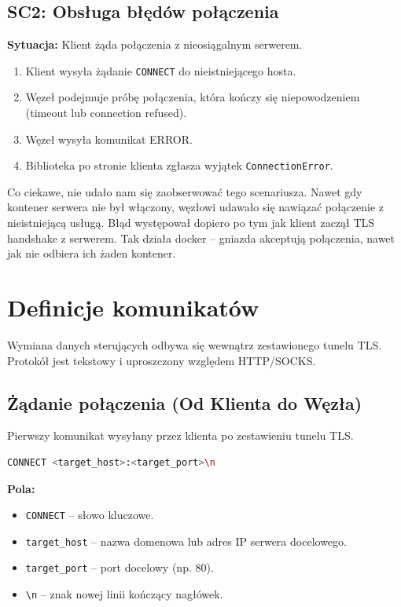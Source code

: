 \documentclass[12pt, a4paper]{article}
\begin{document}
\subsection{SC2: Obsługa błędów połączenia}
\textbf{Sytuacja:} Klient żąda połączenia z nieosiągalnym serwerem.
\begin{enumerate}
    \item Klient wysyła żądanie \texttt{CONNECT} do nieistniejącego hosta.
    \item Węzeł podejmuje próbę połączenia, która kończy się niepowodzeniem (timeout lub connection refused).
    \item Węzeł wysyła komunikat ERROR.
    \item Biblioteka po stronie klienta zgłasza wyjątek \texttt{ConnectionError}.
\end{enumerate}

Co ciekawe, nie udało nam się zaobserwować tego scenariusza. Nawet gdy kontener serwera
nie był włączony, węzłowi udawało się nawiązać połączenie z nieistniejącą usługą. Błąd występował
dopiero po tym jak klient zaczął TLS handshake z serwerem. Tak działa docker -- gniazda akceptują
połączenia, nawet jak nie odbiera ich żaden kontener.

\section{Definicje komunikatów}

Wymiana danych sterujących odbywa się wewnątrz zestawionego tunelu TLS. Protokół jest tekstowy i uproszczony względem HTTP/SOCKS.

\subsection{Żądanie połączenia (Od Klienta do Węzła)}
Pierwszy komunikat wysyłany przez klienta po zestawieniu tunelu TLS.

\begin{lstlisting}[language=bash, caption=Format komunikatu CONNECT]
CONNECT <target_host>:<target_port>\n
\end{lstlisting}

\noindent \textbf{Pola:}
\begin{itemize}
    \item \texttt{CONNECT} – słowo kluczowe.
    \item \texttt{target\_host} – nazwa domenowa lub adres IP serwera docelowego.
    \item \texttt{target\_port} – port docelowy (np. 80).
    \item \texttt{\textbackslash n} – znak nowej linii kończący nagłówek.
\end{itemize}
\end{document}
